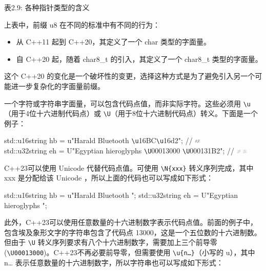 \begin{center}
表2.9: 各种指针类型的含义
\end{center}

上表中，前缀 u8 在不同的标准中有不同的行为：

\begin{itemize}
\item
从 C++11 起到 C++20，其定义了一个 char 类型的字面量。

\item
自 C++20 起，随着 char8\_t 的引入，其定义了一个 char8\_t 类型的字面量。
\end{itemize}

这个 C++20 的变化是一个破坏性的变更，选择这种方式是为了避免引入另一个可能进一步复杂化的字面量前缀。

一个字符或字符串字面量，可以包含代码点值，而非实际字符。这些必须用 \verb|\u|（用于4位十六进制代码点）或 \verb|\U|（用于8位十六进制代码点）转义。下面是一个例子：

\begin{tcolorbox}[ breakable,colback = blue!5!white, colframe=black!7!white]
\scriptsize{
std::u16string hb = u"Harald Bluetooth \verb|\u|16BC\verb|\u|16d2"; // \includegraphics[width=0.02\textwidth]{content/chapter2/images/code-3.png}  \\
std::u32string eh = U"Egyptian hieroglyphs \verb|\U|00013000 \verb|\U|000131B2"; // \includegraphics[width=0.04\textwidth]{content/chapter2/images/code-4.png}
}
\end{tcolorbox}

C++23可以使用 Unicode 代替代码点值。可使用 \verb|\N{xxx}| 转义序列完成，其中 xxx 是分配给该 Unicode ，所以上面的代码也可以写成如下形式：

\begin{cpp}
std::u16string hb = u"Harald Bluetooth ";
std::u32string eh = U"Egyptian hieroglyphs  ";
\end{cpp}

此外，C++23可以使用任意数量的十六进制数字表示代码点值。前面的例子中，包含埃及象形文字的字符串包含了代码点 13000，这是一个五位数的十六进制数。但由于 \verb|\U| 转义序列要求有八个十六进制数字，需要加上三个前导零 (\verb|\U00013000|)。C++23不再必要前导零，但需要使用 \verb|\u{n…}|（小写的 u），其中 n… 表示任意数量的十六进制数字，所以字符串也可以写成如下形式：

